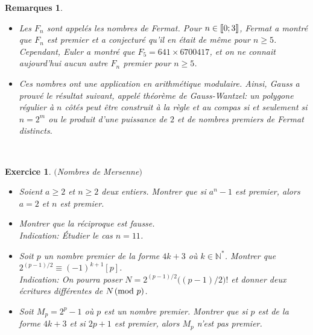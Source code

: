 \documentclass[11pt,a4paper]{article}
\newtheorem{ex}{Exercice}
\newtheorem*{rem2}{Remarques}
\begin{document}
\begin{rem2}\
\begin{itemize}
\item[•]Les $F_n$ sont appelés les nombres de Fermat. Pour $n \in \llbracket 0;3 \rrbracket $, Fermat a montré que $F_n$ est premier et a conjecturé qu'il en était de même pour $n \geqslant 5$. Cependant, Euler a montré que $F_5=641 \times 6700417$, et on ne connait aujourd'hui aucun autre $F_n$ premier pour $n \geqslant 5$.
\item[•]Ces nombres ont une application en arithmétique modulaire. Ainsi, Gauss a prouvé le résultat suivant, appelé théorème de Gauss-Wantzel: un polygone régulier à $n$ côtés peut être construit à la règle et au compas si et seulement si $n=2^m$ ou le produit d'une puissance de $2$ et de nombres premiers de Fermat distincts. 
\end{itemize} 
\end{rem2}





\begin{comment}
\begin{ex}\
On suppose qu'on dispose d'un algorithme de test de primalité TestPrim$($n$)$ qui renvoie vrai si $n$ est premier et faux sinon. A partir de cet algorithme, écrire un algorithme PreSui$($n$)$ qui, à partir d'un entier naturel $n$, renvoie le plus petit nombre premier strictement supérieur à $n$.
\end{ex}

\
\end{comment}



\


\begin{ex}\label{exNombres_Mersenne}$($Nombres de Mersenne$)$
\begin{itemize}
\item[$1.$] Soient $a \geqslant 2$ et $n \geqslant 2$ deux entiers. Montrer que si $a^n-1$ est premier, alors $a=2$ et $n$ est premier. 
\item[$2.$] Montrer que la réciproque est fausse.\\
\textit{Indication: Étudier le cas $n=11$.}
\item[$3.$] Soit $p$ un nombre premier de la forme $4k+3$ où $k \in \mathbb{N}^*$. Montrer que $2^{(p-1)/2}\equiv (-1)^{k+1}[p]$.\\
\textit{Indication: On pourra poser $N=2^{(p-1)/2}\big( (p-1)/2 \big)!$ et donner deux écritures différentes de $N \! \! \pmod p$. }
\item[$4.$] Soit $M_p=2^p-1$ où $p$ est un nombre premier. Montrer que si $p$ est de la forme $4k+3$ et si $2p+1$ est premier, alors $M_p$ n'est pas premier.  
\end{itemize}

\end{ex}
\end{document}
